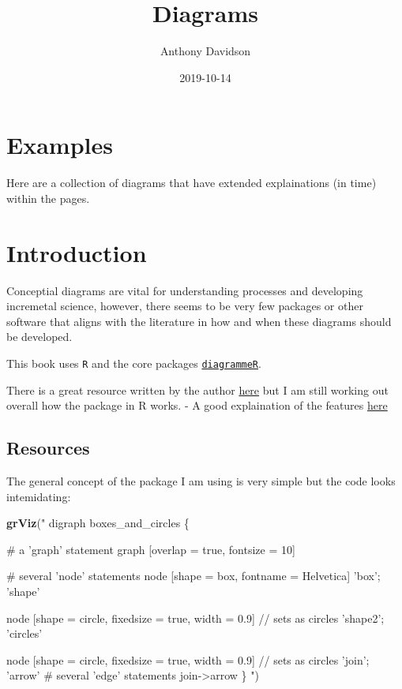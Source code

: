 \documentclass[]{book}
\title{Diagrams}
\author{Anthony Davidson}
\date{2019-10-14}
\newenvironment{Shaded}{\begin{snugshade}}{\end{snugshade}}
\newcommand{\KeywordTok}[1]{\textcolor[rgb]{0.13,0.29,0.53}{\textbf{#1}}}
\newcommand{\NormalTok}[1]{#1}
\newcommand{\StringTok}[1]{\textcolor[rgb]{0.31,0.60,0.02}{#1}}
\begin{document}
\maketitle

{
\setcounter{tocdepth}{1}
\tableofcontents
}
\hypertarget{exams}{%
\chapter{Examples}\label{exams}}

Here are a collection of diagrams that have extended explainations (in time) within the pages.

\hypertarget{intro}{%
\chapter{Introduction}\label{intro}}

Conceptial diagrams are vital for understanding processes and developing incremetal science, however, there seems to be very few packages or other software that aligns with the literature in how and when these diagrams should be developed.

This book uses \texttt{R} and the core packages \href{https://cran.r-project.org/web/packages/DiagrammeR/index.html}{\texttt{diagrammeR}}.

There is a great resource written by the author \href{https://rich-iannone.github.io/DiagrammeR/index.html}{here} but I am still working out overall how the package in R works.
- A good explaination of the features \href{https://rich-iannone.github.io/DiagrammeR/index.html\#features}{here}

\hypertarget{resources}{%
\section{Resources}\label{resources}}

The general concept of the package I am using is very simple but the code looks intemidating:

\begin{Shaded}
\begin{Highlighting}[]
\KeywordTok{grViz}\NormalTok{(}\StringTok{"}
\StringTok{digraph boxes_and_circles \{}

\StringTok{  # a 'graph' statement}
\StringTok{  graph [overlap = true, fontsize = 10]}

\StringTok{  # several 'node' statements}
\StringTok{  node [shape = box,}
\StringTok{        fontname = Helvetica]}
\StringTok{  'box'; 'shape'}

\StringTok{  node [shape = circle,}
\StringTok{        fixedsize = true,}
\StringTok{        width = 0.9] // sets as circles}
\StringTok{  'shape2'; 'circles'}

\StringTok{  node [shape = circle,}
\StringTok{        fixedsize = true,}
\StringTok{        width = 0.9] // sets as circles}
\StringTok{  'join'; 'arrow'}
\StringTok{  }
\StringTok{  # several 'edge' statements}
\StringTok{  join->arrow}
\StringTok{\}}
\StringTok{"}\NormalTok{)}
\end{Highlighting}
\end{Shaded}
\end{document}
